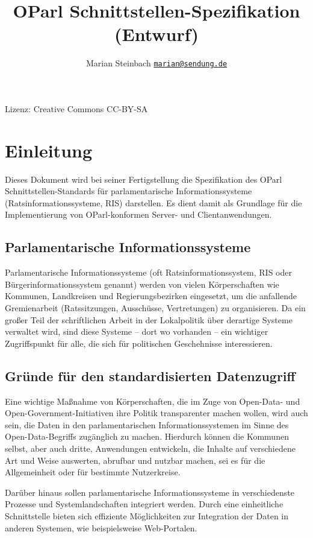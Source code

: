 \documentclass[,a4paper]{article}
\title{OParl Schnittstellen-Spezifikation (Entwurf)}
\author{Marian Steinbach
                \href{mailto:marian@sendung.de}{\texttt{marian@sendung.de}}}
\date{}
\begin{document}
\maketitle

Lizenz: Creative Commons CC-BY-SA

\section{Einleitung}

Dieses Dokument wird bei seiner Fertigstellung die Spezifikation des
OParl Schnittstellen-Standards für parlamentarische Informationssysteme
(Ratsinformationssysteme, RIS) darstellen. Es dient damit als Grundlage
für die Implementierung von OParl-konformen Server- und
Clientanwendungen.

\subsection{Parlamentarische Informationssysteme}

Parlamentarische Informationssysteme (oft Ratsinformationssystem, RIS
oder Bürgerinformationssystem genannt) werden von vielen Körperschaften
wie Kommunen, Landkreisen und Regierungsbezirken eingesetzt, um die
anfallende Gremienarbeit (Ratssitzungen, Ausschüsse, Vertretungen) zu
organisieren. Da ein großer Teil der schriftlichen Arbeit in der
Lokalpolitik über derartige Systeme verwaltet wird, sind diese Systeme
-- dort wo vorhanden -- ein wichtiger Zugriffspunkt für alle, die sich
für politischen Geschehnisse interessieren.

\subsection{Gründe für den standardisierten Datenzugriff}

Eine wichtige Maßnahme von Körperschaften, die im Zuge von Open-Data-
und Open-Government-Initiativen ihre Politik transparenter machen
wollen, wird auch sein, die Daten in den parlamentarischen
Informationssystemen im Sinne des Open-Data-Begriffs zugänglich zu
machen. Hierdurch können die Kommunen selbst, aber auch dritte,
Anwendungen entwickeln, die Inhalte auf verschiedene Art und Weise
auswerten, abrufbar und nutzbar machen, sei es für die Allgemeinheit
oder für bestimmte Nutzerkreise.

Darüber hinaus sollen parlamentarische Informationssysteme in
verschiedenste Prozesse und Systemlandschaften integriert werden. Durch
eine einheitliche Schnittstelle bieten sich effiziente Möglichkeiten zur
Integration der Daten in anderen Systemen, wie beispielsweise
Web-Portalen.
\end{document}
